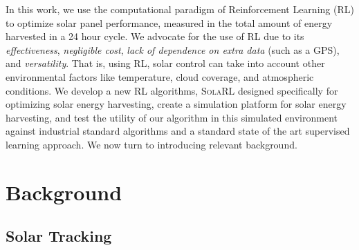 \documentclass[11pt]{article}
\begin{document}
In this work, we use the computational paradigm of Reinforcement Learning (RL) to optimize solar panel performance, measured in the total amount of energy harvested in a 24 hour cycle. We advocate for the use of RL due to its {\it effectiveness}, {\it negligible cost}, {\it lack of dependence on extra data} (such as a GPS), and {\it versatility}. That is, using RL, solar control can take into account other environmental factors like temperature, cloud coverage, and atmospheric conditions. We develop a new RL algorithms, \textsc{SolaRL} designed specifically for optimizing solar energy harvesting, create a simulation platform for solar energy harvesting, and test the utility of our algorithm in this simulated environment against industrial standard algorithms and a standard state of the art supervised learning approach. We now turn to introducing relevant background.


\section{Background}





\subsection{Solar Tracking}




\end{document}
